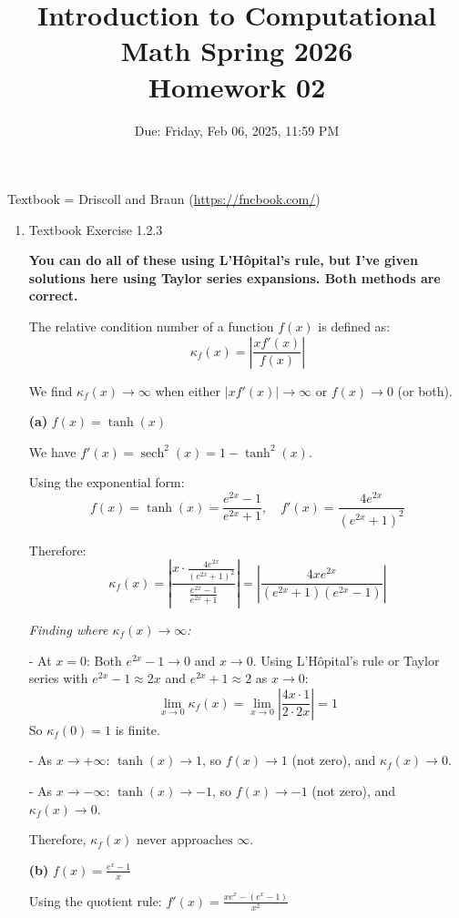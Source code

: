 \documentclass[reqno, answers]{exam}
\title{Introduction to Computational Math Spring 2026 \\ Homework 02}
\date{Due: Friday, Feb 06, 2025, 11:59 PM}
\author{}
\begin{document}
\maketitle
\thispagestyle{empty}

Textbook = Driscoll and Braun (\url{https://fncbook.com/})

\begin{enumerate}

\item Textbook Exercise 1.2.3

\begin{solution}

\textbf{You can do all of these using L'Hôpital's rule, but I've given solutions here using Taylor series expansions. Both methods are correct.}

The relative condition number of a function $f(x)$ is defined as:
$$\kappa_f(x) = \left|\frac{xf'(x)}{f(x)}\right|$$

We find $\kappa_f(x) \to \infty$ when either $|xf'(x)| \to \infty$ or $f(x) \to 0$ (or both).

\textbf{(a)} $f(x) = \tanh(x)$

We have $f'(x) = \operatorname{sech}^2(x) = 1 - \tanh^2(x)$.

Using the exponential form:
$$f(x) = \tanh(x) = \frac{e^{2x} - 1}{e^{2x} + 1}, \quad f'(x) = \frac{4e^{2x}}{(e^{2x} + 1)^2}$$

Therefore:
$$\kappa_f(x) = \left|\frac{x \cdot \frac{4e^{2x}}{(e^{2x} + 1)^2}}{\frac{e^{2x} - 1}{e^{2x} + 1}}\right| = \left|\frac{4xe^{2x}}{(e^{2x} + 1)(e^{2x} - 1)}\right|$$

\textit{Finding where $\kappa_f(x) \to \infty$:}

- At $x = 0$: Both $e^{2x} - 1 \to 0$ and $x \to 0$. Using L'Hôpital's rule or Taylor series with $e^{2x} - 1 \approx 2x$ and $e^{2x} + 1 \approx 2$ as $x \to 0$:
$$\lim_{x \to 0} \kappa_f(x) = \lim_{x \to 0} \left|\frac{4x \cdot 1}{2 \cdot 2x}\right| = 1$$
So $\kappa_f(0) = 1$ is finite.

- As $x \to +\infty$: $\tanh(x) \to 1$, so $f(x) \to 1$ (not zero), and $\kappa_f(x) \to 0$.

- As $x \to -\infty$: $\tanh(x) \to -1$, so $f(x) \to -1$ (not zero), and $\kappa_f(x) \to 0$.

Therefore, $\boxed{\kappa_f(x) \text{ never approaches } \infty}$.

\textbf{(b)} $f(x) = \frac{e^x - 1}{x}$

Using the quotient rule: $f'(x) = \frac{xe^x - (e^x - 1)}{x^2}$


\end{solution}
\end{enumerate}
\end{document}
